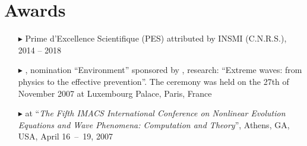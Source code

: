 \section*{Awards}
\begin{itemize}
    \item[$\blacktriangleright$] Prime d'Excellence Scientifique (PES) attributed by INSMI (C.N.R.S.), 2014 -- 2018
    \item[$\blacktriangleright$] , nomination ``Environment'' sponsored by , research: ``Extreme waves: from physics to the effective prevention''. The ceremony was held on the 27\textsuperscript{}{th} of November 2007 at Luxembourg Palace, Paris, France
    \item[$\blacktriangleright$]  at ``\textit{The Fifth IMACS International Conference on Nonlinear Evolution Equations and Wave Phenomena: Computation and Theory}'', Athens, GA, USA, April 16~--~19, 2007
\end{itemize}

